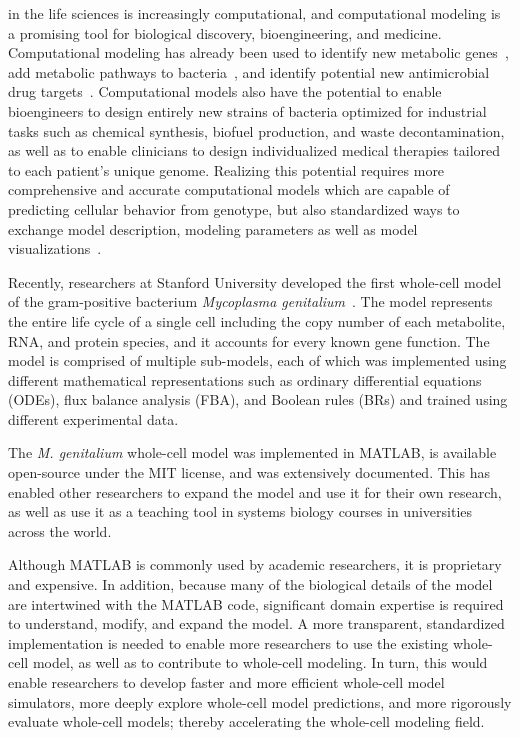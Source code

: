 \documentclass[journal,transmag]{IEEEtran}
\begin{document}
 in the life sciences is increasingly computational, and computational modeling is a promising tool for biological discovery, bioengineering, and medicine. Computational modeling has already been used to identify new metabolic genes~\cite{Reed2006}, add metabolic pathways to bacteria~\cite{Lee2009}, and identify potential new antimicrobial drug targets~\cite{Lee2012}. 
Computational models also have the potential to enable bioengineers to design entirely new strains of bacteria optimized for industrial tasks such as chemical synthesis, biofuel production, and waste decontamination, as well as to enable clinicians to design individualized medical therapies tailored to each patient's unique genome. 
Realizing this potential requires more comprehensive and accurate computational models which are capable of predicting cellular behavior from genotype, but also standardized ways to exchange model description, modeling parameters as well as model visualizations~\cite{Macklin2014,Karr2015,Klipp07}.

Recently, researchers at Stanford University developed the first whole-cell model of the gram-positive bacterium \textit{Mycoplasma genitalium}~\cite{Karr2012}. 
The model represents the entire life cycle of a single cell including the copy number of each metabolite, RNA, and protein species, and it accounts for every known gene function. 
The model is comprised of multiple sub-models, each of which was implemented using different mathematical representations such as ordinary differential equations (ODEs), flux balance analysis (FBA), and Boolean rules (BRs) and trained using different experimental data. 

The \textit{M. genitalium} whole-cell model was implemented in MATLAB, is available open-source under the MIT license, and was extensively documented. 
This has enabled other researchers to expand the model and use it for their own research, as well as use it as a teaching tool in systems biology courses in universities across the world. 

Although MATLAB is commonly used by academic researchers, it is proprietary and expensive. In addition, because many of the biological details of the model are intertwined with the MATLAB code, significant domain expertise is required to understand, modify, and expand the model. 
A more transparent, standardized implementation is needed to enable more researchers to use the existing whole-cell model, as well as to contribute to whole-cell modeling. 
In turn, this would enable researchers to develop faster and more efficient whole-cell model simulators, more deeply explore whole-cell model predictions, and more rigorously evaluate whole-cell models; thereby accelerating the whole-cell modeling field.
\end{document}
